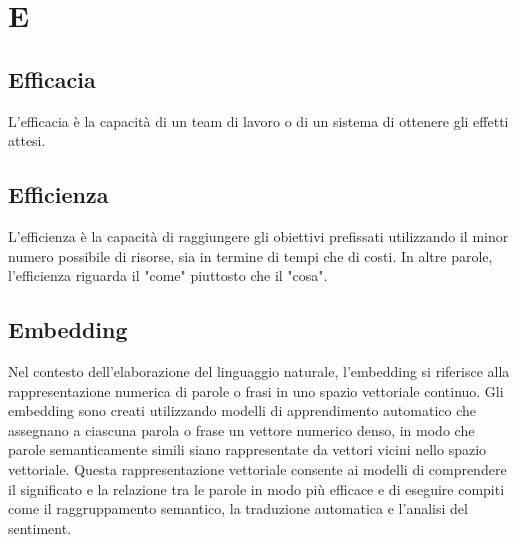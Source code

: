 \section{E}

\vspace{2em}
\subsection*{Efficacia}
\par L'efficacia è la capacità di un team di lavoro o di un sistema di ottenere gli effetti attesi.

\vspace{2em}
\subsection*{Efficienza}
\par L'efficienza è la capacità di raggiungere gli obiettivi prefissati utilizzando il minor numero possibile di risorse, sia in termine di tempi che di costi. In altre parole, l'efficienza riguarda il "come" piuttosto che il "cosa".

\vspace{2em}
\subsection*{Embedding}
\par Nel contesto dell'elaborazione del linguaggio naturale, l'embedding si riferisce alla rappresentazione numerica di parole o frasi in uno spazio vettoriale continuo. Gli embedding sono creati utilizzando modelli di apprendimento automatico che assegnano a ciascuna parola o frase un vettore numerico denso, in modo che parole semanticamente simili siano rappresentate da vettori vicini nello spazio vettoriale. Questa rappresentazione vettoriale consente ai modelli di comprendere il significato e la relazione tra le parole in modo più efficace e di eseguire compiti come il raggruppamento semantico, la traduzione automatica e l'analisi del sentiment.
